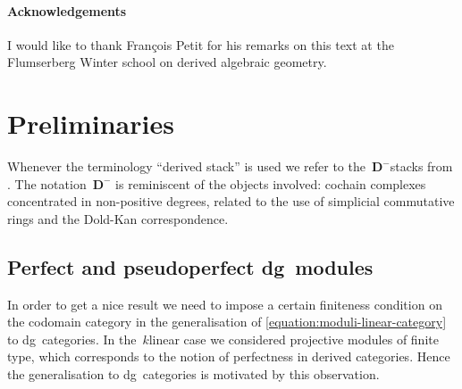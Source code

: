 \begin{refsection}
\paragraph{Acknowledgements}
I would like to thank Fran\c{c}ois Petit for his remarks on this text at the Flumserberg Winter school on derived algebraic geometry.


\section{Preliminaries}
\label{section:preliminaries}
Whenever the terminology ``derived stack'' is used we refer to the~$\mathbf{D}^-$\dash stacks from \cite{hagII}. The notation~$\mathbf{D}^-$ is reminiscent of the objects involved: cochain complexes concentrated in non-positive degrees, related to the use of simplicial commutative rings and the Dold-Kan correspondence.

\subsection{Perfect and pseudoperfect dg~modules}
In order to get a nice result we need to impose a certain finiteness condition on the codomain category in the generalisation of \eqref{equation:moduli-linear-category} to dg~categories. In the~$k$\dash linear case we considered projective modules of finite type, which corresponds to the notion of perfectness in derived categories. Hence the generalisation to dg~categories is motivated by this observation.


\end{refsection}
